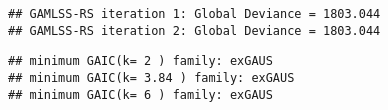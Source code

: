 \begin{verbatim}
## GAMLSS-RS iteration 1: Global Deviance = 1803.044 
## GAMLSS-RS iteration 2: Global Deviance = 1803.044
\end{verbatim}

\begin{Shaded}
\begin{Highlighting}[]
\OtherTok{\textless{}{-}} \NormalTok{, }\NormalTok{, }\NormalTok{)}
\end{Highlighting}
\end{Shaded}

\begin{verbatim}
## minimum GAIC(k= 2 ) family: exGAUS 
## minimum GAIC(k= 3.84 ) family: exGAUS 
## minimum GAIC(k= 6 ) family: exGAUS
\end{verbatim}

\begin{Shaded}
\begin{Highlighting}[]
\end{Highlighting}
\end{Shaded}

